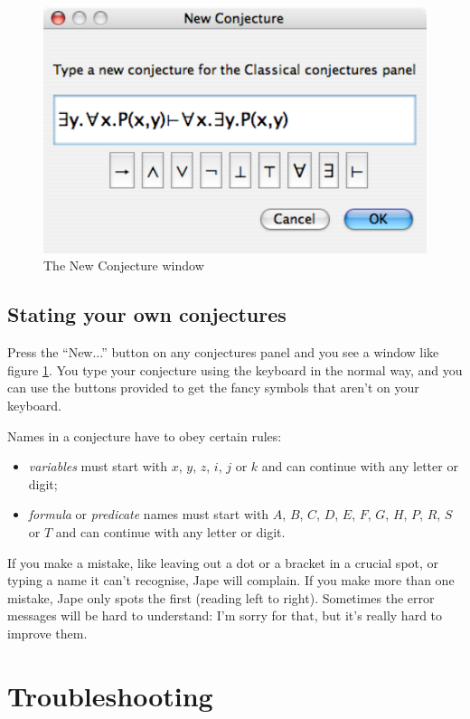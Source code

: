 \documentclass[11pt]{book}
\newcommand{\figref}[1]{figure \ref{fig:#1}}
\begin{document}
\begin{figure}
\centering
\includegraphics[scale=0.5]{pics/newconjecturewindow}
\caption{The New Conjecture window}
\label{fig:newconjecturewindow}
\end{figure}

\section{Stating your own conjectures}

Press the ``New...'' button on any conjectures panel and you see a window like \figref{newconjecturewindow}. You type your conjecture using the keyboard in the normal way, and you can use the buttons provided to get the fancy symbols that aren't on your keyboard.

Names in a conjecture have to obey certain rules:
\begin{itemize}
\item \emph{variables} must start with $x$, $y$, $z$, $i$, $j$ or $k$ and can continue with any letter or digit;
\item \emph{formula} or \emph{predicate} names must start with $A$, $B$, $C$, $D$, $E$, $F$, $G$, $H$, $P$, $R$, $S$ or $T$ and can continue with any letter or digit.
\end{itemize}

If you make a mistake, like leaving out a dot or a bracket in a crucial spot, or typing a name it can't recognise, Jape will complain. If you make more than one mistake, Jape only spots the first (reading left to right). Sometimes the error messages will be hard to understand: I'm sorry for that, but it's really hard to improve them. 

\chapter{Troubleshooting}
\end{document}
